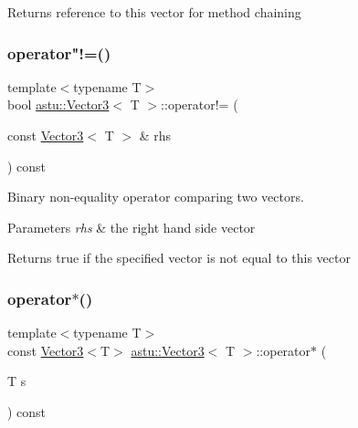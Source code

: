 \begin{DoxyReturn}{Returns}
reference to this vector for method chaining 
\end{DoxyReturn}
\mbox{\label{classastu_1_1Vector3_acfa026172a7baefb2096e6489499d0d8}} 
\subsubsection{\texorpdfstring{operator"!=()}{operator!=()}}
{\footnotesize\ttfamily template$<$typename T$>$ \\
bool \hyperlink{classastu_1_1Vector3}{astu\+::\+Vector3}$<$ T $>$\+::operator!= (\begin{DoxyParamCaption}\item[{const \hyperlink{classastu_1_1Vector3}{Vector3}$<$ T $>$ \&}]{rhs }\end{DoxyParamCaption}) const\hspace{0.3cm}{\ttfamily [inline]}}

Binary non-\/equality operator comparing two vectors.


\begin{DoxyParams}{Parameters}
{\em rhs} & the right hand side vector \\
\hline
\end{DoxyParams}
\begin{DoxyReturn}{Returns}
{\ttfamily true} if the specified vector is not equal to this vector 
\end{DoxyReturn}
\mbox{\label{classastu_1_1Vector3_a3a9a71ee7a4cae2fdec116f6a937e0a4}} 
\subsubsection{\texorpdfstring{operator$\ast$()}{operator*()}}
{\footnotesize\ttfamily template$<$typename T$>$ \\
const \hyperlink{classastu_1_1Vector3}{Vector3}$<$T$>$ \hyperlink{classastu_1_1Vector3}{astu\+::\+Vector3}$<$ T $>$\+::operator$\ast$ (\begin{DoxyParamCaption}\item[{T}]{s }\end{DoxyParamCaption}) const\hspace{0.3cm}{\ttfamily [inline]}}

